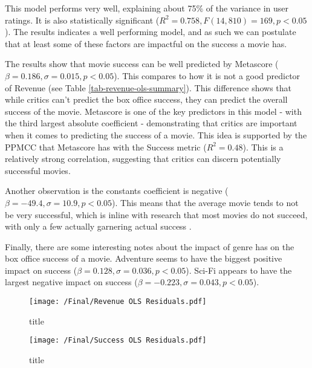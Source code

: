     This model performs very well, explaining about 75\% of the variance in user ratings.
        It is also statistically significant ($R^2=0.758, F(14,810)=169, p<0.05$).
    The results indicates a well performing model, and as such we can postulate 
        that at least some of these factors are impactful on the success a movie has.

    The results show that movie success can be well predicted by Metascore ($\beta=0.186, \sigma=0.015, p<0.05$).
    This compares to how it is not a good predictor of Revenue (see Table \ref{tab-revenue-ols-summary}).
    This difference shows that while critics can't predict the box office success, they can predict the 
        overall success of the movie.
    Metascore is one of the key predictors in this model - with the third largest absolute coefficient - 
        demonstrating that critics are important when it comes to predicting the success of a movie.
    This idea is supported by the PPMCC that Metascore has with the Success metric ($R^2=0.48$).
    This is a relatively strong correlation, suggesting that critics can discern potentially successful movies.
    
    Another observation is the constants coefficient is negative ($\beta=-49.4,\sigma=10.9,p<0.05$).
    This means that the average movie tends to not be very successful, which is inline with research that
        most movies do not succeed, with only a few actually garnering actual success \cite{walls2005modelling}.

    Finally, there are some interesting notes about the impact of genre has on the box office success of a movie.
    Adventure seems to have the biggest positive impact on success ($\beta=0.128,\sigma=0.036,p<0.05$).
    Sci-Fi appears to have the largest negative impact on success ($\beta=-0.223,\sigma=0.043,p<0.05$).

\begin{figure}[H]
    \texttt{[image: /Final/Revenue OLS Residuals.pdf]}
    \caption[short]{title}\label{fig-revenue-ols-residuals}
\end{figure}

\begin{figure}[H]
    \texttt{[image: /Final/Success OLS Residuals.pdf]}
    \caption[short]{title}\label{fig-success-ols-residuals}
\end{figure}
